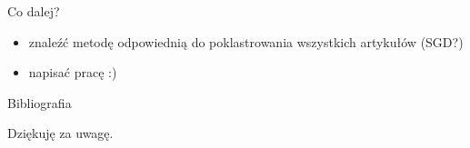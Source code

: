 \documentclass[11pt,pdftex,mathserif]{beamer}\usepackage[]{graphicx}\usepackage[]{color}
\theoremstyle{definition}
\begin{document}
\begin{frame}{Co dalej?}
\begin{itemize}
\item znaleźć metodę odpowiednią do poklastrowania wszystkich artykułów (SGD?)
\item napisać pracę :)
\end{itemize}
\end{frame}

\begin{frame}{Bibliografia}
%

\end{frame}


% 
% 
% 
% 

\begin{frame}{}
   \begin{center}
      \Huge{Dziękuję za uwagę.}
   \end{center}
\end{frame}
\end{document}
